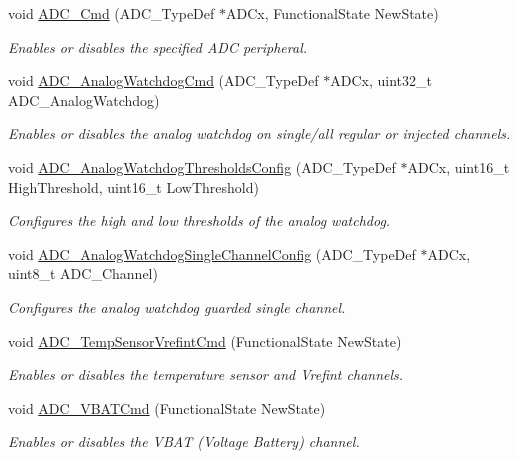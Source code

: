 \begin{DoxyCompactItemize}
void \hyperlink{group___a_d_c_ga40882d399e3371755ed610c1134e634e}{A\-D\-C\-\_\-\-Cmd} (A\-D\-C\-\_\-\-Type\-Def $\ast$A\-D\-Cx, Functional\-State New\-State)
\begin{DoxyCompactList}\small\item\em Enables or disables the specified A\-D\-C peripheral. \end{DoxyCompactList}\item 
void \hyperlink{group___a_d_c_gad017d69bec6e497afd35ba25ea22d86e}{A\-D\-C\-\_\-\-Analog\-Watchdog\-Cmd} (A\-D\-C\-\_\-\-Type\-Def $\ast$A\-D\-Cx, uint32\-\_\-t A\-D\-C\-\_\-\-Analog\-Watchdog)
\begin{DoxyCompactList}\small\item\em Enables or disables the analog watchdog on single/all regular or injected channels. \end{DoxyCompactList}\item 
void \hyperlink{group___a_d_c_ga79588d02aa8e4147f21cb90a4708366d}{A\-D\-C\-\_\-\-Analog\-Watchdog\-Thresholds\-Config} (A\-D\-C\-\_\-\-Type\-Def $\ast$A\-D\-Cx, uint16\-\_\-t High\-Threshold, uint16\-\_\-t Low\-Threshold)
\begin{DoxyCompactList}\small\item\em Configures the high and low thresholds of the analog watchdog. \end{DoxyCompactList}\item 
void \hyperlink{group___a_d_c_ga03cef3d12292ffa2b8520524d5b0226c}{A\-D\-C\-\_\-\-Analog\-Watchdog\-Single\-Channel\-Config} (A\-D\-C\-\_\-\-Type\-Def $\ast$A\-D\-Cx, uint8\-\_\-t A\-D\-C\-\_\-\-Channel)
\begin{DoxyCompactList}\small\item\em Configures the analog watchdog guarded single channel. \end{DoxyCompactList}\item 
void \hyperlink{group___a_d_c_ga848682e2d7d3de9f8cf03ffa4c11f0b5}{A\-D\-C\-\_\-\-Temp\-Sensor\-Vrefint\-Cmd} (Functional\-State New\-State)
\begin{DoxyCompactList}\small\item\em Enables or disables the temperature sensor and Vrefint channels. \end{DoxyCompactList}\item 
void \hyperlink{group___a_d_c_ga17fc58510ddc80024e65d9738ad6e98c}{A\-D\-C\-\_\-\-V\-B\-A\-T\-Cmd} (Functional\-State New\-State)
\begin{DoxyCompactList}\small\item\em Enables or disables the V\-B\-A\-T (Voltage Battery) channel. \end{DoxyCompactList}\item 

\end{DoxyCompactItemize}
